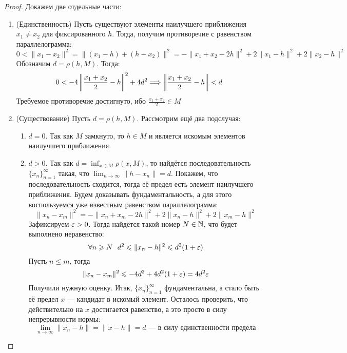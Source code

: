 \begin{proof}
	Докажем две отдельные части:
	\begin{enumerate}
		\item (Единственность) Пусть существуют элементы наилучшего приближения $x_1 \neq x_2$ для фиксированного $h$. Тогда, получим противоречие с равенством параллелограмма:
		\[
			0 < \|x_1 - x_2\|^2 = \|(x_1 - h) + (h - x_2)\|^2 = -\|x_1 + x_2 - 2h\|^2 + 2\|x_1 - h\|^2 + 2\|x_2 - h\|^2
		\]
		Обозначим $d = \rho(h, M)$. Тогда:
		\[
			0 < -4\left\|\frac{x_1 + x_2}{2} - h\right\|^2 + 4d^2 \Longrightarrow \left\|\frac{x_1 + x_2}{2} - h\right\| < d
		\]
		Требуемое противоречие достигнуто, ибо $\frac{x_1 + x_2}{2} \in M$
		
		\item (Существование) Пусть $d = \rho(h, M)$. Рассмотрим ещё два подслучая:
		\begin{enumerate}
			\item $d = 0$. Так как $M$ замкнуто, то $h \in M$ и является искомым элементов наилучшего приближения.
			
			\item $d > 0$. Так как $d = \inf_{x \in M} \rho(x, M)$, то найдётся последовательность $\{x_n\}_{n = 1}^\infty$ такая, что $\lim_{n \to \infty} \|h - x_n\| = d$. Покажем, что последовательность сходится, тогда её предел есть элемент наилучшего приближения. Будем доказывать фундаментальность, а для этого воспользуемся уже известным равенством параллелограмма:
			\[
				\|x_n - x_m\|^2 = -\|x_n + x_m - 2h\|^2 + 2\|x_n - h\|^2 + 2\|x_m - h\|^2
			\]
			Зафиксируем $\varepsilon > 0$. Тогда найдётся такой номер $N \in \mathbb{N}$, что будет выполнено неравенство:
			\[
				\forall n \geqslant N\ \ d^2 \leqslant \|x_n - h\|^2 \leqslant d^2(1 + \varepsilon)
			\]
			Пусть $n \le m$, тогда
			\[
				\|x_n - x_m\|^2 \leqslant -4d^2 + 4d^2(1 + \varepsilon) = 4d^2\varepsilon
			\]
			Получили нужную оценку. Итак, $\{x_n\}_{n = 1}^\infty$ фундаментальна, а стало быть её предел $x$ --- кандидат в искомый элемент. Осталось проверить, что действительно на $x$ достигается равенство, а это просто в силу непрерывности нормы:
			\[
				\lim_{n \to \infty} \|x_n - h\| = \|x - h\| = d \text{ --- в силу единственности предела}
			\]
		\end{enumerate}
	\end{enumerate}
\end{proof}

